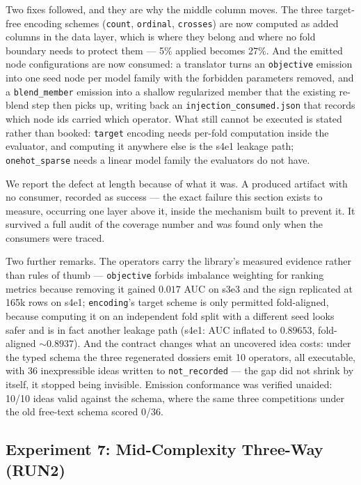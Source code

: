 \documentclass[11pt,a4paper]{article}
\begin{document}
Two fixes followed, and they are why the middle column moves. The three target-free encoding schemes (\texttt{count}, \texttt{ordinal}, \texttt{crosses}) are now computed as added columns in the data layer, which is where they belong and where no fold boundary needs to protect them --- 5\% applied becomes 27\%. And the emitted node configurations are now consumed: a translator turns an \texttt{objective} emission into one seed node per model family with the forbidden parameters removed, and a \texttt{blend\_member} emission into a shallow regularized member that the existing re-blend step then picks up, writing back an \texttt{injection\_consumed.json} that records which node ids carried which operator. What still cannot be executed is stated rather than booked: \texttt{target} encoding needs per-fold computation inside the evaluator, and computing it anywhere else is the s4e1 leakage path; \texttt{onehot\_sparse} needs a linear model family the evaluators do not have.

We report the defect at length because of what it was. A produced artifact with no consumer, recorded as success --- the exact failure this section exists to measure, occurring one layer above it, inside the mechanism built to prevent it. It survived a full audit of the coverage number and was found only when the consumers were traced.

Two further remarks. The operators carry the library's measured evidence rather than rules of thumb --- \texttt{objective} forbids imbalance weighting for ranking metrics because removing it gained $0.017$ AUC on s3e3 and the sign replicated at 165k rows on s4e1; \texttt{encoding}'s target scheme is only permitted fold-aligned, because computing it on an independent fold split with a different seed looks safer and is in fact another leakage path (s4e1: AUC inflated to $0.89653$, fold-aligned $\sim\!0.8937$). And the contract changes what an uncovered idea costs: under the typed schema the three regenerated dossiers emit 10 operators, all executable, with 36 inexpressible ideas written to \texttt{not\_recorded} --- the gap did not shrink by itself, it stopped being invisible. Emission conformance was verified unaided: 10/10 ideas valid against the schema, where the same three competitions under the old free-text schema scored 0/36.

\subsection{Experiment 7: Mid-Complexity Three-Way (RUN2)}
\label{sec:exp7run2}
\end{document}
